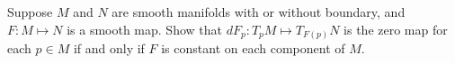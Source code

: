 Suppose $M$ and $N$ are smooth manifolds with or without boundary, and $F:M \mapsto N$ is a smooth map. Show that $dF_p : T_pM \mapsto T_{F(p)}N$ is the zero map for each $p \in M$ if and only if $F$ is constant on each component of $M$.